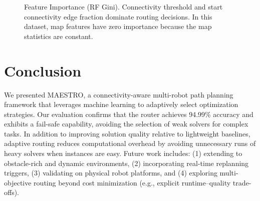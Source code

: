 \documentclass[conference]{IEEEtran}
\newcommand{\systemname}{MAESTRO}
\begin{document}
\begin{figure}[t]
\centering
{}

\caption{Feature Importance (RF Gini). Connectivity threshold and start connectivity edge fraction dominate routing decisions. In this dataset, map features have zero importance because the map statistics are constant.}
\label{fig:feat_importance}
\end{figure}

\section{Conclusion}
\label{sec:conclusion}

We presented \systemname{}, a connectivity-aware multi-robot path planning framework that leverages machine learning to adaptively select optimization strategies. Our evaluation confirms that the router achieves 94.99\% accuracy and exhibits a fail-safe capability, avoiding the selection of weak solvers for complex tasks. In addition to improving solution quality relative to lightweight baselines, adaptive routing reduces computational overhead by avoiding unnecessary runs of heavy solvers when instances are easy.
Future work includes: (1) extending to obstacle-rich and dynamic environments, (2) incorporating real-time replanning triggers, (3) validating on physical robot platforms, and (4) exploring multi-objective routing beyond cost minimization (e.g., explicit runtime--quality trade-offs).
\end{document}
